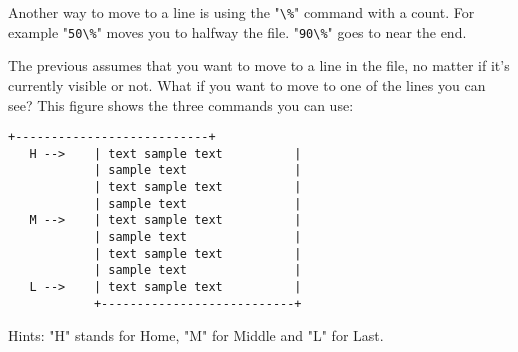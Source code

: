 Another way to move to a line is using the "\verb!\%!" command with a count. 
For example "\verb!50\%!" moves you to halfway the file.
"\verb!90\%!" goes to near the end.

The previous assumes that you want to move to a line in the file, no matter if it's currently visible or not.
What if you want to move to one of the lines you can see?
This figure shows the three commands you can use:

\begin{Verbatim}[samepage=true]
            +---------------------------+
   H -->    | text sample text          |
            | sample text               |
            | text sample text          |
            | sample text               |
   M -->    | text sample text          |
            | sample text               |
            | text sample text          |
            | sample text               |
   L -->    | text sample text          |
            +---------------------------+
\end{Verbatim}

Hints: "H" stands for Home, "M" for Middle and "L" for Last.

